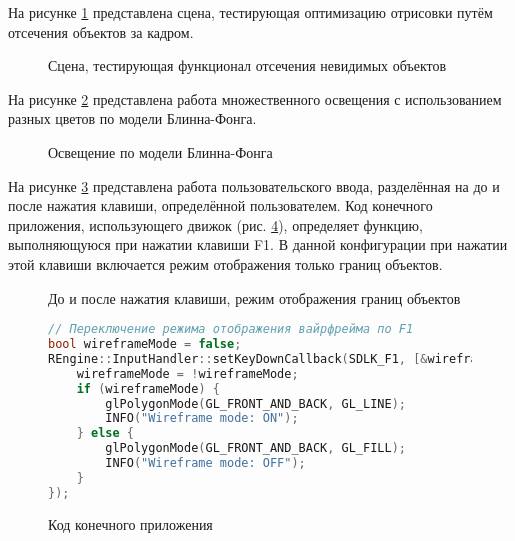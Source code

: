 На рисунке \ref{culling:image} представлена сцена, тестирующая оптимизацию отрисовки путём отсечения объектов за кадром.

\begin{figure}[H]
\caption{Сцена, тестирующая функционал отсечения невидимых объектов}
\label{culling:image}
\end{figure}

На рисунке \ref{blinnPhong:image} представлена работа множественного освещения с использованием разных цветов по модели Блинна-Фонга.

\begin{figure}[H]
\caption{Освещение по модели Блинна-Фонга}
\label{blinnPhong:image}
\end{figure}

На рисунке \ref{input:image} представлена работа пользовательского ввода, разделённая на до и после нажатия клавиши, определённой пользователем. Код конечного приложения, использующего движок (рис. \ref{input:code}), определяет функцию, выполняющуюся при нажатии клавиши F1. В данной конфигурации при нажатии этой клавиши включается режим отображения только границ объектов.

\begin{figure}[H]
\caption{До и после нажатия клавиши, режим отображения границ объектов}
\label{input:image}
\end{figure}

\begin{figure}[H]
\begin{lstlisting}[language=C++]
// Переключение режима отображения вайрфрейма по F1
bool wireframeMode = false;
REngine::InputHandler::setKeyDownCallback(SDLK_F1, [&wireframeMode]() {
    wireframeMode = !wireframeMode;
    if (wireframeMode) {
        glPolygonMode(GL_FRONT_AND_BACK, GL_LINE);
        INFO("Wireframe mode: ON");
    } else {
        glPolygonMode(GL_FRONT_AND_BACK, GL_FILL);
        INFO("Wireframe mode: OFF");
    }
});
\end{lstlisting}
\caption{Код конечного приложения}
\label{input:code}
\end{figure}



